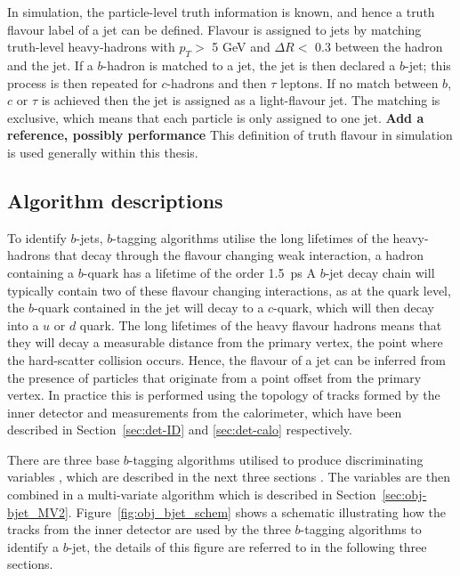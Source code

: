 In simulation, the particle-level truth information is known, and hence a truth flavour label of a jet can be defined.
Flavour is assigned to jets by matching truth-level heavy-hadrons with $p_{T} >$ 5 GeV and $\Delta R <$ 0.3 between the hadron and the jet.
If a $b$-hadron is matched to a jet, the jet is then declared a $b$-jet;
this process is then repeated for $c$-hadrons and then $\tau$ leptons.
If no match between $b$, $c$ or $\tau$ is achieved then the jet is assigned as a light-flavour jet.
The matching is exclusive, which means that each particle is only assigned to one jet. \textbf{Add a reference, possibly performance}
This definition of truth flavour in simulation is used generally within this thesis.
   
\subsection{Algorithm descriptions}

To identify $b$-jets, $b$-tagging algorithms utilise the long lifetimes of the heavy-hadrons that decay through the flavour changing weak interaction,
a hadron containing a $b$-quark has a lifetime of the order \SI{1.5}{\pico\second} %
A $b$-jet decay chain  will typically contain two of these flavour changing interactions, 
as at the quark level, the $b$-quark contained in the jet will decay to a $c$-quark, which will then decay into a $u$ or $d$ quark.
The long lifetimes of the heavy flavour hadrons means that they will decay a measurable distance from the 
primary vertex, the point where the hard-scatter collision occurs.
Hence, the flavour of a jet can be inferred from the presence of particles
that originate from a point offset from the primary vertex.
In practice this is performed using the topology of tracks formed by the inner detector
and measurements from the calorimeter, which have been described in Section~\ref{sec:det-ID} and \ref{sec:det-calo} respectively.
   
There are three base $b$-tagging algorithms utilised to produce discriminating variables \cite{obj-bjet_algo_2016}, which are described in the next three sections .
The variables are then combined in a multi-variate algorithm which is described in Section~\ref{sec:obj-bjet_MV2}.
Figure~\ref{fig:obj_bjet_schem} shows a schematic illustrating how the tracks from the inner detector
are used by the three $b$-tagging algorithms to identify a $b$-jet, the details of this figure are referred to in the following three sections.


